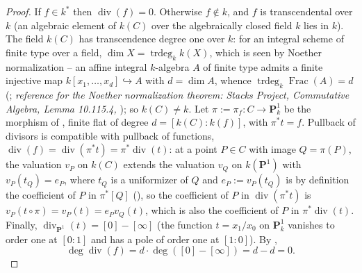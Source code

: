 \begin{proof}
If \(f\in k^*\) then \(\operatorname{div}(f)=0\).  Otherwise
\(f\notin k\), and \(f\) is transcendental over \(k\) (an algebraic
element of \(k(C)\) over the algebraically closed field \(k\) lies
in \(k\)).  The field \(k(C)\) has transcendence degree one over
\(k\): for an integral scheme of finite type over a field,
\(\dim X=\operatorname{trdeg}_kk(X)\), which is seen by Noether
normalization -- an affine integral \(k\)-algebra \(A\) of finite
type admits a finite injective map
\(k[x_1,\dots,x_d]\hookrightarrow A\) with \(d=\dim A\), whence
\(\operatorname{trdeg}_k\operatorname{Frac}(A)=d\)
(; \emph{reference
for the Noether normalization theorem: Stacks Project, Commutative
Algebra, Lemma 10.115.4, }); so \(k(C)\neq k\).  Let \(\pi:=\pi_f:C\to\mathbf P^1_k\)
be the morphism of , finite flat
of degree \(d=[k(C):k(f)]\), with \(\pi^*t=f\).  Pullback of
divisors is compatible with pullback of functions,
\(\operatorname{div}(f)=\operatorname{div}(\pi^*t)=\pi^*\operatorname{div}(t)\):
at a point \(P\in C\) with image \(Q=\pi(P)\), the valuation \(v_P\)
on \(k(C)\) extends the valuation \(v_Q\) on \(k(\mathbf P^1)\) with
\(v_P(t_Q)=e_P\), where \(t_Q\) is a uniformizer of \(Q\) and
\(e_P:=v_P(t_Q)\) is by definition the coefficient of \(P\) in
\(\pi^*[Q]\) (), so the coefficient of
\(P\) in \(\operatorname{div}(\pi^*t)\) is
\(v_P(t\circ\pi)=v_P(t)=e_Pv_Q(t)\), which is also the coefficient of
\(P\) in \(\pi^*\operatorname{div}(t)\).  Finally,
\(\operatorname{div}_{\mathbf P^1}(t)=[0]-[\infty]\) (the function
\(t=x_1/x_0\) on \(\mathbf P^1_k\) vanishes to order one at
\([0:1]\) and has a pole of order one at \([1:0]\)).  By
,
\[
 \deg\operatorname{div}(f)=d\cdot\deg([0]-[\infty])=d-d=0.
\]
\end{proof}

